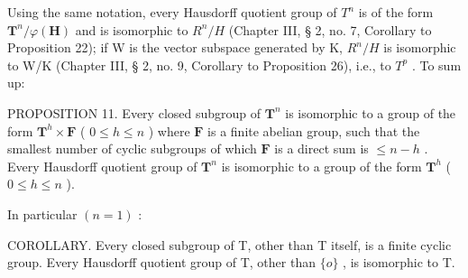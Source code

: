Using the same notation, every Hausdorff quotient group of \(T^{n}\) is of the form \(\mathbf{T}^{n}/\varphi(\mathbf{H})\) and is isomorphic to \(R^{n}/H\) (Chapter III, § 2, no. 7, Corollary to Proposition 22); if W is the vector subspace generated by K, \(R^{n}/H\) is isomorphic to W/K (Chapter III, § 2, no. 9, Corollary to Proposition 26), i.e., to \(T^{p}\) . To sum up:

PROPOSITION 11. Every closed subgroup of \(\mathbf{T}^n\) is isomorphic to a group of the form \(\mathbf{T}^h \times \mathbf{F}\) ( \(0 \leqslant h \leqslant n\) ) where \(\mathbf{F}\) is a finite abelian group, such that the smallest number of cyclic subgroups of which \(\mathbf{F}\) is a direct sum is \(\leqslant n - h\) . Every Hausdorff quotient group of \(\mathbf{T}^n\) is isomorphic to a group of the form \(\mathbf{T}^h\) ( \(0 \leqslant h \leqslant n\) ).

In particular \((n = 1)\) :

COROLLARY. Every closed subgroup of T, other than T itself, is a finite cyclic group. Every Hausdorff quotient group of T, other than \(\{o\}\) , is isomorphic to T.


